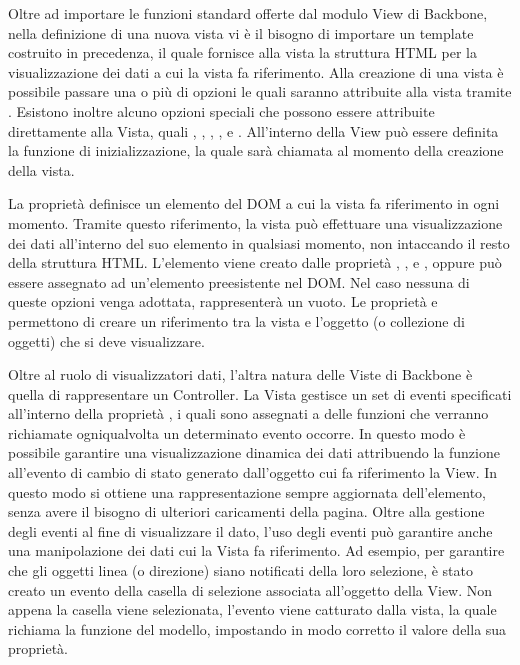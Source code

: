 Oltre ad importare le funzioni standard offerte dal modulo View di Backbone, nella definizione di una nuova vista vi è il bisogno di importare un template costruito in precedenza, il quale fornisce alla vista la struttura HTML per la visualizzazione dei dati a cui la vista fa riferimento.
Alla creazione di una vista è possibile passare una o più di opzioni le quali saranno attribuite alla vista tramite . Esistono inoltre alcuno opzioni speciali che possono essere attribuite direttamente alla Vista, quali , , , ,   e . All'interno della View può essere definita la funzione di inizializzazione, la quale sarà chiamata al momento della creazione della vista.

La proprietà  definisce un elemento del DOM a cui la vista fa riferimento in ogni momento. Tramite questo riferimento, la vista può effettuare una visualizzazione dei dati all'interno del suo elemento  in qualsiasi momento, non intaccando il resto della struttura HTML. L'elemento  viene creato dalle proprietà , ,  e , oppure può essere assegnato ad un'elemento preesistente nel DOM. Nel caso nessuna di queste opzioni venga adottata,  rappresenterà un  vuoto.
Le proprietà  e  permettono di creare un riferimento tra la vista e l'oggetto (o collezione di oggetti) che si deve visualizzare.

Oltre al ruolo di visualizzatori dati, l'altra natura delle Viste di Backbone è quella di rappresentare un Controller. La Vista gestisce un set di eventi specificati all'interno della proprietà , i quali sono assegnati a delle funzioni che verranno richiamate ogniqualvolta un determinato evento occorre.
In questo modo è possibile garantire una visualizzazione dinamica dei dati attribuendo la funzione  all'evento di cambio di stato generato dall'oggetto cui fa riferimento la View. In questo modo si ottiene una rappresentazione sempre aggiornata dell'elemento, senza avere il bisogno di ulteriori caricamenti della pagina.
Oltre alla gestione degli eventi al fine di visualizzare il dato, l'uso degli eventi può garantire anche una manipolazione dei dati cui la Vista fa riferimento.
Ad esempio, per garantire che gli oggetti linea (o direzione) siano notificati della loro selezione, è stato creato un evento  della casella di selezione associata all'oggetto della View. Non appena la casella viene selezionata, l'evento viene catturato dalla vista, la quale richiama la funzione  del modello, impostando in modo corretto il valore della sua proprietà.

